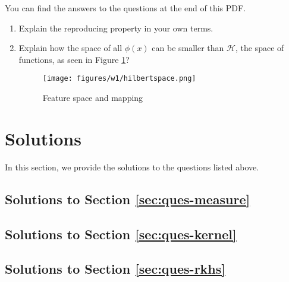 \documentclass[12pt]{article}
\begin{document}
You can find the answers to the questions at the end of this PDF.

\begin{enumerate}
    \item Explain the reproducing property in your own terms.

    \item Explain how the space of all $\phi(x)$ can be smaller than $\mathcal{H}$, the space of functions, as seen in Figure \ref{fig:hilbertspace}? 
    \begin{figure}[h!]
        \centering
        \texttt{[image: figures/w1/hilbertspace.png]}
        \caption{Feature space and mapping}
        \label{fig:hilbertspace}
    \end{figure}
    
\end{enumerate}

\section{Solutions}

In this section, we provide the solutions to the questions listed above.

\subsection{Solutions to Section \ref{sec:ques-measure}}

\subsection{Solutions to Section \ref{sec:ques-kernel}}

\subsection{Solutions to Section \ref{sec:ques-rkhs}}

%


\end{document}
